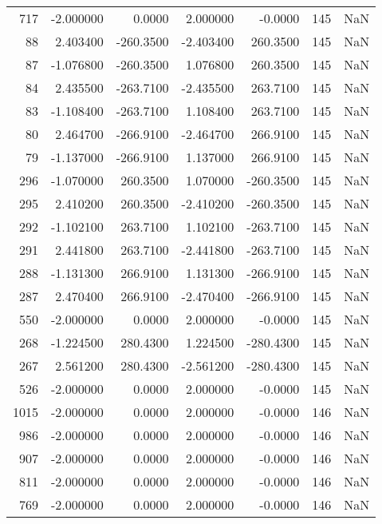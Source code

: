 \begin{tabular}{rrrrrrr}
 717 &   -2.000000 &    0.0000 &    2.000000 &     -0.0000 &         145 & NaN \\
  88 &    2.403400 & -260.3500 &   -2.403400 &    260.3500 &         145 & NaN \\
  87 &   -1.076800 & -260.3500 &    1.076800 &    260.3500 &         145 & NaN \\
  84 &    2.435500 & -263.7100 &   -2.435500 &    263.7100 &         145 & NaN \\
  83 &   -1.108400 & -263.7100 &    1.108400 &    263.7100 &         145 & NaN \\
  80 &    2.464700 & -266.9100 &   -2.464700 &    266.9100 &         145 & NaN \\
  79 &   -1.137000 & -266.9100 &    1.137000 &    266.9100 &         145 & NaN \\
 296 &   -1.070000 &  260.3500 &    1.070000 &   -260.3500 &         145 & NaN \\
 295 &    2.410200 &  260.3500 &   -2.410200 &   -260.3500 &         145 & NaN \\
 292 &   -1.102100 &  263.7100 &    1.102100 &   -263.7100 &         145 & NaN \\
 291 &    2.441800 &  263.7100 &   -2.441800 &   -263.7100 &         145 & NaN \\
 288 &   -1.131300 &  266.9100 &    1.131300 &   -266.9100 &         145 & NaN \\
 287 &    2.470400 &  266.9100 &   -2.470400 &   -266.9100 &         145 & NaN \\
 550 &   -2.000000 &    0.0000 &    2.000000 &     -0.0000 &         145 & NaN \\
 268 &   -1.224500 &  280.4300 &    1.224500 &   -280.4300 &         145 & NaN \\
 267 &    2.561200 &  280.4300 &   -2.561200 &   -280.4300 &         145 & NaN \\
 526 &   -2.000000 &    0.0000 &    2.000000 &     -0.0000 &         145 & NaN \\
1015 &   -2.000000 &    0.0000 &    2.000000 &     -0.0000 &         146 & NaN \\
 986 &   -2.000000 &    0.0000 &    2.000000 &     -0.0000 &         146 & NaN \\
 907 &   -2.000000 &    0.0000 &    2.000000 &     -0.0000 &         146 & NaN \\
 811 &   -2.000000 &    0.0000 &    2.000000 &     -0.0000 &         146 & NaN \\
 769 &   -2.000000 &    0.0000 &    2.000000 &     -0.0000 &         146 & NaN \\

\end{tabular}
